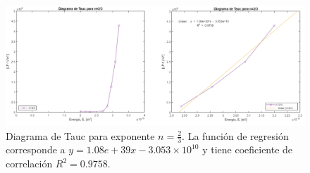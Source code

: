 \documentclass[article]{article}
\begin{document}
        \begin{figure}[H]
        \centering
        \includegraphics[width=0.75\linewidth]{2_3-gap.png}
        \caption{ Diagrama de Tauc para exponente $ n=\frac{2}{3}$. La función de regresión corresponde a $y=1.08e+39x-3.053\times10^{10}$ y tiene coeficiente de correlación $R^2=0.9758$.}
        \label{fig:gap 4}
    \end{figure}
    
            
    
        
    
\end{document}
